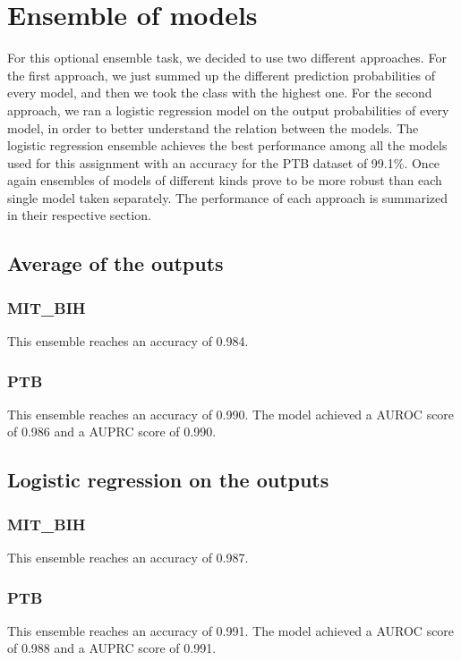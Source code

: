 \documentclass[11pt]{scrartcl}
\begin{document}
\section{Ensemble of models}
For this optional ensemble task, we decided to use two different approaches. For the first approach, we just summed up the different prediction probabilities of every model, and then we took the class with the highest one. For the second approach, we ran a logistic regression model on the output probabilities of every model, in order to better understand the relation between the models. 
The logistic regression ensemble achieves the best performance among all the models used for this assignment with an accuracy for the PTB dataset of 99.1\%. Once again ensembles of models of different kinds prove to be more robust than each single model taken separately.
The performance of each approach is summarized in their respective section.

\subsection{Average of the outputs}
\subsubsection{MIT\_BIH}
This ensemble reaches an accuracy of 0.984.

\subsubsection{PTB}
This ensemble reaches an accuracy of 0.990. The model achieved a AUROC score of 0.986 and a AUPRC score of 0.990.

\subsection{Logistic regression on the outputs}


\subsubsection{MIT\_BIH}
This ensemble reaches an accuracy of 0.987.

\subsubsection{PTB}
This ensemble reaches an accuracy of 0.991. The model achieved a AUROC score of 0.988 and a AUPRC score of 0.991.
\end{document}
